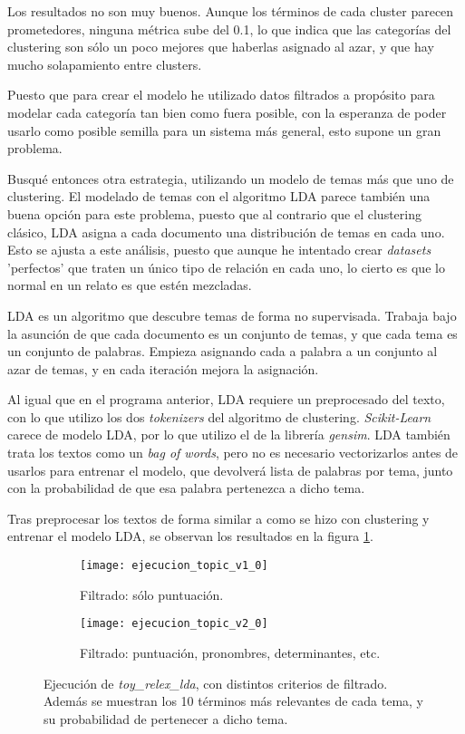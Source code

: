 \documentclass{pre-tfg}
\begin{document}
Los resultados no son muy buenos. Aunque los términos de cada cluster parecen prometedores, ninguna métrica sube del 0.1, lo que indica que las categorías del clustering son sólo un poco mejores que haberlas asignado al azar, y que hay mucho solapamiento entre clusters.

Puesto que para crear el modelo he utilizado datos filtrados a propósito para modelar cada categoría tan bien como fuera posible, con la esperanza de poder usarlo como posible semilla para un sistema más general, esto supone un gran problema.

Busqué entonces otra estrategia, utilizando un modelo de temas más que uno de clustering. El modelado de temas con el algoritmo LDA parece también una buena opción para este problema, puesto que al contrario que el clustering clásico, LDA asigna a cada documento una distribución de temas en cada uno. Esto se ajusta a este análisis, puesto que aunque he intentado crear \textit{datasets} 'perfectos' que traten un único tipo de relación en cada uno, lo cierto es que lo normal en un relato es que estén mezcladas.

LDA es un algoritmo que descubre temas de forma no supervisada. Trabaja bajo la asunción de que cada documento es un conjunto de temas, y que cada tema es un conjunto de palabras. Empieza asignando cada a palabra a un conjunto al azar de temas, y en cada iteración mejora la asignación. 

Al igual que en el programa anterior, LDA requiere un preprocesado del texto, con lo que utilizo los dos \textit{tokenizers} del algoritmo de clustering. \textit{Scikit-Learn} carece de modelo LDA, por lo que utilizo el de la librería \textit{gensim}. LDA también trata los textos como un \textit{bag of words}, pero no es necesario vectorizarlos antes de usarlos para entrenar el modelo, que devolverá  lista de palabras por tema, junto con la probabilidad de que esa palabra pertenezca a dicho tema.

Tras preprocesar los textos de forma similar a como se hizo con clustering y entrenar el modelo LDA, se observan los resultados en la figura \ref{fig:topicresult1}.

\begin{figure}
	\begin{subfigure}{\textwidth}
		\hspace{-1cm}
		\texttt{[image: ejecucion\_topic\_v1\_0]}
		\caption{Filtrado: sólo puntuación.}
		\label{fig:topicresult1}
	
	\end{subfigure}
	\begin{subfigure}{\textwidth}
		\hspace{-1cm}
		\texttt{[image: ejecucion\_topic\_v2\_0]}
		\caption{Filtrado: puntuación, pronombres, determinantes, etc.}
		\label{fig:topicresult2}
	\end{subfigure}

	\caption{Ejecución de \textit{toy\_relex\_lda}, con distintos criterios de filtrado. Además se muestran los 10 términos más relevantes de cada tema, y su probabilidad de pertenecer a dicho tema.}

\end{figure}
\end{document}
